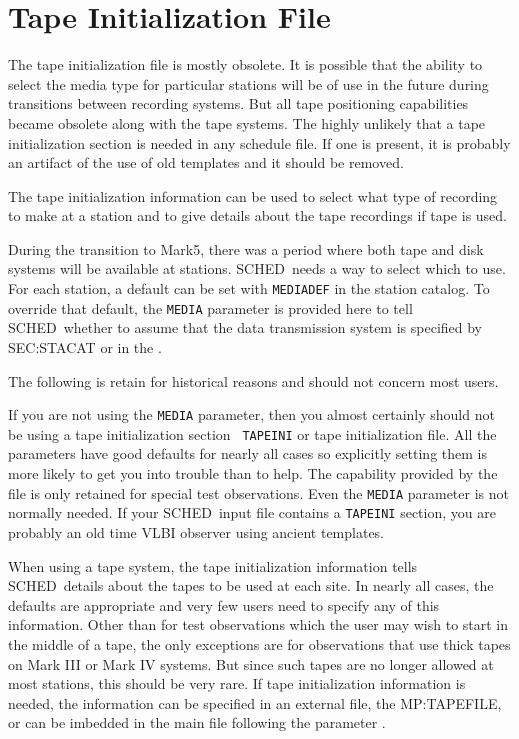 \documentclass{report}
\newcommand{\schedb}{{\sc SCHED~}}
\begin{document}
\section{\label{SEC:TPINI}Tape Initialization File}

The tape initialization file is mostly obsolete.  It is possible that
the ability to select the media type for particular stations will be
of use in the future during transitions between recording systems.
But all tape positioning capabilities became obsolete along with the
tape systems.  The highly unlikely that a tape initialization section
is needed in any schedule file.  If one is present, it is probably an
artifact of the use of old templates and it should be removed.

The tape initialization information can be used to select what
type of recording to make at a station and to give details about
the tape recordings if tape is used.

During the transition to Mark5, there was a period where both
tape and disk systems will be available at stations.  \schedb needs
a way to select which to use.  For each station, a default can be
set with {\tt MEDIADEF} in the station catalog. To override that
default, the {\tt MEDIA} parameter is provided here to tell
\schedb whether to assume that the data transmission system is
specified by  {SEC:STACAT} or  in the .

The following is retain for historical reasons and should not concern
most users.

If you are not using the {\tt MEDIA} parameter, then you almost
certainly should not be using a tape initialization section {\tt
TAPEINI} or tape initialization file.  All the parameters have good
defaults for nearly all cases so explicitly setting them is more
likely to get you into trouble than to help.  The capability provided
by the file is only retained for special test observations.  Even the
{\tt MEDIA} parameter is not normally needed.  If your \schedb input
file contains a {\tt TAPEINI} section, you are probably an old time
VLBI observer using ancient templates.

When using a tape system, the tape initialization information tells
\schedb details about the tapes to be used at each site.  In nearly
all cases, the defaults are appropriate and very few users need to
specify any of this information.  Other than for test observations
which the user may wish to start in the middle of a tape, the only
exceptions are for observations that use thick tapes on Mark III or
Mark IV systems.  But since such tapes are no longer allowed at most
stations, this should be very rare.  If tape initialization
information is needed, the information can be specified in an external
file, the  {MP:TAPEFILE}, or can be imbedded
in the main file following the parameter .
\end{document}

